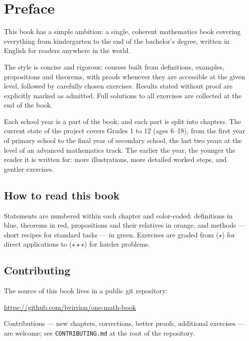 \chapter{Preface}

This book has a simple ambition: a single, coherent mathematics book
covering everything from kindergarten to the end of the bachelor's degree,
written in English for readers anywhere in the world.

The style is concise and rigorous: courses built from definitions, examples,
propositions and theorems, with proofs whenever they are accessible at the
given level, followed by carefully chosen exercises. Results stated without
proof are explicitly marked as admitted. Full solutions to all exercises are
collected at the end of the book.

Each school year is a part of the book, and each part is split into
chapters. The current state of the project covers Grades 1 to 12 (ages
6--18), from the first year of primary school to the final year of
secondary school, the last two years at the level of an advanced
mathematics track. The earlier the year, the younger the reader it is
written for: more illustrations, more detailed worked steps, and gentler
exercises.

\section*{How to read this book}

Statements are numbered within each chapter and color-coded: definitions in
blue, theorems in red, propositions and their relatives in orange, and
methods --- short recipes for standard tasks --- in green. Exercises are
graded from ($\star$) for direct applications to ($\star\star\star$) for
harder problems.

\section*{Contributing}

The source of this book lives in a public git repository:
\begin{center}
\url{https://github.com/bvirrion/one-math-book}
\end{center}
Contributions --- new chapters, corrections, better proofs, additional
exercises --- are welcome; see \texttt{CONTRIBUTING.md} at the root of the
repository.
